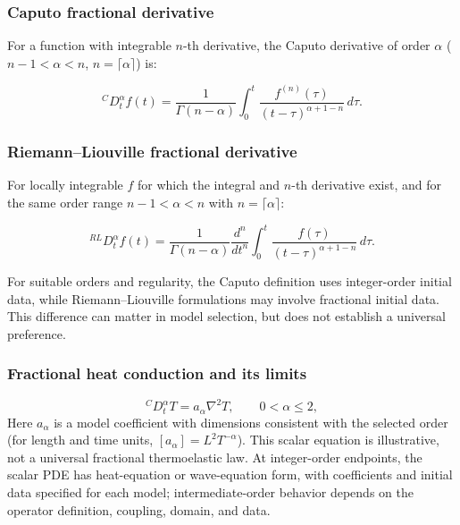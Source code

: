 \subsubsection{Caputo fractional derivative}

For a function with integrable $n$-th derivative, the Caputo derivative of order $\alpha$ ($n-1 < \alpha < n$, $n = \lceil\alpha\rceil$) is:

\begin{equation}
{}^C D_t^\alpha f(t) = \frac{1}{\Gamma(n-\alpha)}\int_0^t \frac{f^{(n)}(\tau)}{(t-\tau)^{\alpha+1-n}}\,d\tau.
\label{eq:6.3}
\end{equation}

\subsubsection{Riemann--Liouville fractional derivative}

For locally integrable $f$ for which the integral and $n$-th derivative exist, and for the same order range $n-1 < \alpha < n$ with $n = \lceil\alpha\rceil$:

\begin{equation}
{}^{RL} D_t^\alpha f(t) = \frac{1}{\Gamma(n-\alpha)}\frac{d^n}{dt^n}\int_0^t \frac{f(\tau)}{(t-\tau)^{\alpha+1-n}}\,d\tau.
\label{eq:6.4}
\end{equation}

For suitable orders and regularity, the Caputo definition uses integer-order initial data, while Riemann--Liouville formulations may involve fractional initial data. This difference can matter in model selection, but does not establish a universal preference.

\subsubsection{Fractional heat conduction and its limits}

\begin{equation}
{}^C D_t^\alpha T = a_\alpha\nabla^2 T, \qquad 0 < \alpha \leq 2,
\label{eq:6.5}
\end{equation}
Here $a_\alpha$ is a model coefficient with dimensions consistent with the selected order (for length and time units, $[a_\alpha]=L^2T^{-\alpha}$). This scalar equation is illustrative, not a universal fractional thermoelastic law. At integer-order endpoints, the scalar PDE has heat-equation or wave-equation form, with coefficients and initial data specified for each model; intermediate-order behavior depends on the operator definition, coupling, domain, and data.

